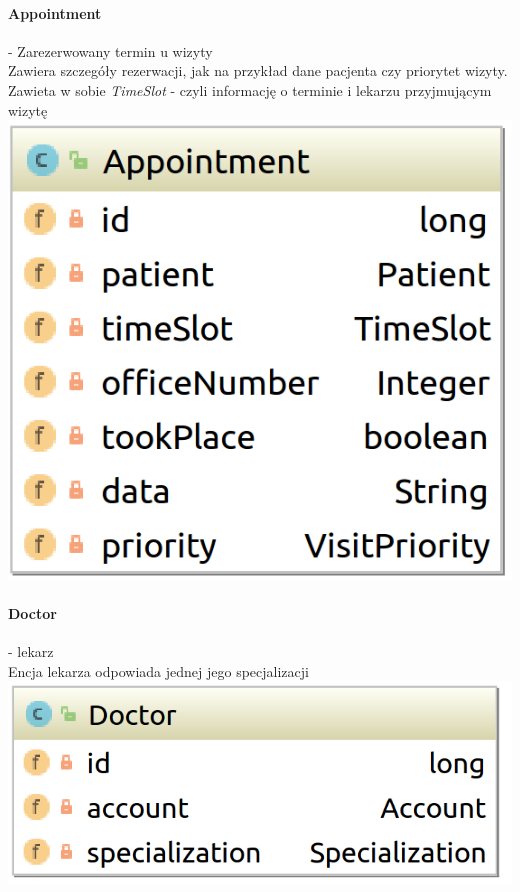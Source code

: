 \documentclass[polish,12pt]{aghthesis}
\begin{document}
    \paragraph{Appointment} - Zarezerwowany termin u wizyty \\
    Zawiera szczegóły rezerwacji, jak na przykład dane pacjenta czy priorytet wizyty.
    Zawieta w sobie \emph{TimeSlot} - czyli informację o terminie i lekarzu przyjmującym wizytę \\
    \includegraphics[width=\textwidth]{Appointment}
    \paragraph{Doctor} - lekarz \\
    Encja lekarza odpowiada jednej jego specjalizacji \\
    \includegraphics[width=\textwidth]{Doctor}
\end{document}
